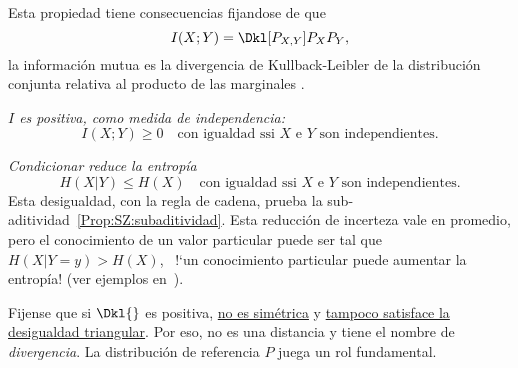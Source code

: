 Esta propiedad
tiene consecuencias fijandose de que
%
\[
I(X;Y) = \Dkl[P_{X,Y}]{P_X P_Y},
\]
%
\ie  la  informaci\'on  mutua  es  la  divergencia  de  Kullback-Leibler  de  la
distribuci\'on    conjunta   relativa    al   producto    de    las   marginales
.
%
\begin{propiedades}
\item\label{Prop:SZ:Ipositive}   {\it   $I$   es   positiva,  como   medida   de
    independencia:}
  \[
  I(X;Y) \ge 0 \quad \mbox{con igualdad ssi $X$ e $Y$ son independientes.}
  \]
%
\item\label{Prop:SZ:condicionar} {\it  Condicionar reduce la  entrop\'ia}
  \[
  H(X|Y) \le H(X) \quad \mbox{con igualdad ssi $X$ e $Y$ son independientes.}
  \]
  Esta    desigualdad,     con    la     regla    de    cadena,     prueba    la
  sub-aditividad~\ref{Prop:SZ:subaditividad}.   Esta  reducci\'on  de  incerteza
  vale en  promedio, pero el conocimiento  de un valor particular  puede ser tal
  que $H(X|Y =  y) > H(X)$, \ie \ !`un conocimiento  particular puede aumentar la
  entrop\'ia!  (ver ejemplos en~\cite[p.~59]{Rio07}).
\end{propiedades}

Fijense  que   si  $\Dkl{}$  es   positiva,  \underline{no  es   sim\'etrica}  y
\underline{tampoco  satisface la  desigualdad triangular}.  Por eso,  no  es una
distancia  y  tiene  el  nombre  de {\it  divergencia}.   La  distribuci\'on  de
referencia $P$ juega un rol fundamental.

